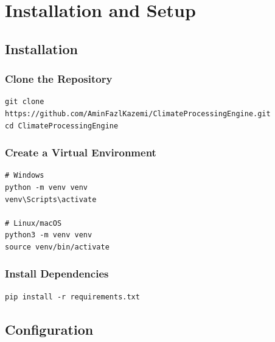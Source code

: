 ﻿\documentclass[12pt,a4paper]{report}
\begin{document}
\chapter{Installation and Setup}
\section{Installation}
\subsection{Clone the Repository}
\begin{lstlisting}[caption=Cloning the Repository]
git clone https://github.com/AminFazlKazemi/ClimateProcessingEngine.git
cd ClimateProcessingEngine
\end{lstlisting}

\subsection{Create a Virtual Environment}
\begin{lstlisting}[caption=Creating Virtual Environment]
# Windows
python -m venv venv
venv\Scripts\activate

# Linux/macOS
python3 -m venv venv
source venv/bin/activate
\end{lstlisting}

\subsection{Install Dependencies}
\begin{lstlisting}[caption=Installing Dependencies]
pip install -r requirements.txt
\end{lstlisting}

\section{Configuration}
\end{document}
